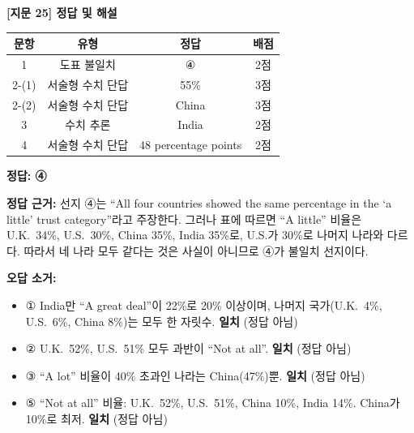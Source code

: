 \documentclass[11pt,a4paper]{article}
\begin{document}
\begin{center}
{\fontsize{15}{17}\selectfont\sffamily\bfseries [지문 25] 정답 및 해설}
\end{center}
\vspace{8pt}

\begin{center}
\begin{tabular}{|c|c|c|c|}
\hline
\textbf{문항} & \textbf{유형} & \textbf{정답} & \textbf{배점} \\\hline
1 & 도표 불일치 & ④ & 2점 \\\hline
2-(1) & 서술형 수치 단답 & 55\% & 3점 \\\hline
2-(2) & 서술형 수치 단답 & China & 3점 \\\hline
3 & 수치 추론 & India & 2점 \\\hline
4 & 서술형 수치 단답 & 48 percentage points & 2점 \\\hline
\end{tabular}
\end{center}

\vspace{12pt}

 \quad \textbf{정답: ④}

\vspace{4pt}
\noindent\textbf{정답 근거:} 선지 ④는 ``All four countries showed the same percentage in the `a little' trust category''라고 주장한다.
그러나 표에 따르면 ``A little'' 비율은 U.K.\ 34\%, U.S.\ 30\%, China 35\%, India 35\%로, U.S.가 30\%로 나머지 나라와 다르다.
따라서 네 나라 모두 같다는 것은 사실이 아니므로 ④가 불일치 선지이다.

\vspace{6pt}
\noindent\textbf{오답 소거:}
\begin{itemize}[leftmargin=2em,itemsep=2pt,topsep=2pt]
  \item ① India만 ``A great deal''이 22\%로 20\% 이상이며, 나머지 국가(U.K.\ 4\%, U.S.\ 6\%, China 8\%)는 모두 한 자릿수. \textbf{일치} (정답 아님)
  \item ② U.K.\ 52\%, U.S.\ 51\% 모두 과반이 ``Not at all''. \textbf{일치} (정답 아님)
  \item ③ ``A lot'' 비율이 40\% 초과인 나라는 China(47\%)뿐. \textbf{일치} (정답 아님)
  \item ⑤ ``Not at all'' 비율: U.K.\ 52\%, U.S.\ 51\%, China 10\%, India 14\%. China가 10\%로 최저. \textbf{일치} (정답 아님)
\end{itemize}
\end{document}
